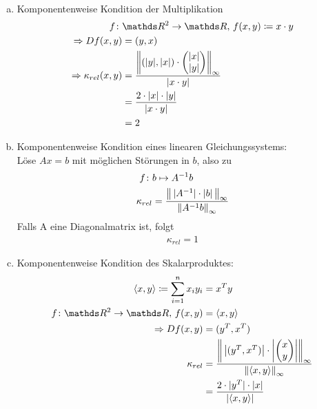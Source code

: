 \begin{Bspe}~
  \begin{enumerate}[a)]
  \item Komponentenweise Kondition der Multiplikation
    \begin{align*}
      f\colon &\R^2 \rightarrow \R, \, f(x,y) \coloneqq x\cdot y \\
      \Rightarrow Df(x,y) &= (y, x)  \\
      \Rightarrow \kappa_{rel}(x,y) &= \frac{\left\| (|y|, |x|)\cdot \begin{pmatrix}
            |x| \\
            |y|
          \end{pmatrix}\right\|_\infty}
      {|x\cdot y|} \\
        &= \frac{2\cdot|x|\cdot |y|}{|x\cdot y|} \\
        &= 2
    \end{align*}
  \item Komponentenweise Kondition eines linearen Gleichungssystems:\\
    Löse $Ax=b$ mit möglichen Störungen in $b$, also zu
    \begin{align*}
      f\colon & b\mapsto A^{-1}b \\
      \kappa_{rel} & = \frac{\left\|  \, |A^{-1}| \cdot |b|\,  \right\|_\infty}{\left\| A^{-1}b \right\|_\infty}
    \end{align*}
    Falls A eine Diagonalmatrix ist, folgt
    \begin{gather*}
      \kappa_{rel}=1
    \end{gather*}
  \item Komponentenweise Kondition des Skalarproduktes:
    \begin{align*}
      \langle x,y \rangle \coloneqq \sum_{i=1}^{n}x_i y_i& = x^Ty \\
      f\colon\R^2 \rightarrow \R, \, f(x,y) &= \langle x,y \rangle \\
      \Rightarrow Df(x,y) &= (y^T, x^T) \\
      \kappa_{rel}  &= \frac{\left\| \,\left|(y^T, x^T)\right|\cdot\left|\begin{pmatrix}
              x \\
              y
            \end{pmatrix}\right|\right\|_\infty }
      {\nn{\langle x,y\rangle}_\infty}\\
                                                         &= \frac{2\cdot |y^T|\cdot |x|}{|\langle x,y\rangle|} \\

\end{align*}
\end{enumerate}
\end{Bspe}
